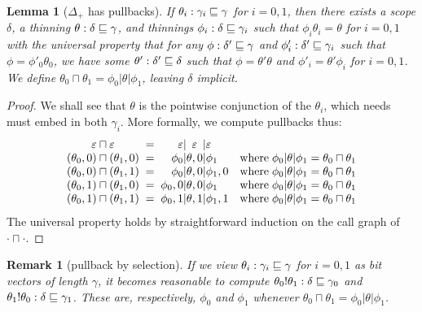 \documentclass{jfp1}
\newtheorem{lemma}[theorem]{Lemma}
\newtheorem{remark}[theorem]{Remark}
\newcommand{\emp}{\varepsilon}
\begin{document}
\newcommand{\pb}[2]{#1 \sqcap #2}
\newcommand{\cp}[2]{#1 \sqcup #2}
\begin{lemma}[$\Delta_+$ has pullbacks]
  If $\theta_i : \gamma_i\sqsubseteq\gamma$ for $i=0,1$, then there exists a
  scope $\delta$, a thinning $\theta : \delta\sqsubseteq\gamma$, and
  thinnings $\phi_i : \delta\sqsubseteq\gamma_i$ such that
  $\phi_i\theta_i = \theta$  for $i=0,1$ with the universal property that
  for any $\phi:\delta'\sqsubseteq\gamma$ and $\phi'_i : \delta'\sqsubseteq\gamma_i$ such that
  $\phi=\phi'_0\theta_0$, we have some $\theta' : \delta'\sqsubseteq\delta$
  such that
  $\phi=\theta'\theta$ and
  $\phi'_i = \theta'\phi_i$ for $i=0,1$. We define
  $\pb{\theta_0}{\theta_1} = \phi_0 | \theta | \phi_1$,
  leaving $\delta$ implicit.
\end{lemma}
\begin{proof}
  We shall see that $\theta$ is the pointwise conjunction of the $\theta_i$,
  which needs must embed in both $\gamma_i$. More formally, we compute pullbacks thus:
  \[\begin{array}{c@{\;\;=\;\;}r@{|}c@{|}ll}
    \pb{\emp}{\emp} & \emp&\emp&\emp & \\
    \pb{(\theta_0,0)}{(\theta_1,0)} & \phi_0&\theta,0&\phi_1
      & \mbox{where}\;\phi_0|\theta|\phi_1 = \pb{\theta_0}{\theta_1} \\                                     
    \pb{(\theta_0,0)}{(\theta_1,1)} & \phi_0&\theta,0&\phi_1,0
      & \mbox{where}\;\phi_0|\theta|\phi_1 = \pb{\theta_0}{\theta_1} \\
    \pb{(\theta_0,1)}{(\theta_1,0)} & \phi_0,0&\theta,0&\phi_1
      & \mbox{where}\;\phi_0|\theta|\phi_1 = \pb{\theta_0}{\theta_1} \\
    \pb{(\theta_0,1)}{(\theta_1,1)} & \phi_0,1&\theta,1&\phi_1,1
      & \mbox{where}\;\phi_0|\theta|\phi_1 = \pb{\theta_0}{\theta_1} \\
    \end{array}\]
  The universal property holds by straightforward induction on the call graph
  of $\pb\cdot\cdot$.
\end{proof}

\begin{remark}[pullback by selection]
  If we view $\theta_i : \gamma_i\sqsubseteq\gamma$ for $i=0,1$ as bit
  vectors of length $\gamma$, it
  becomes reasonable to compute $\theta_0!\theta_1 :
  \delta\sqsubseteq\gamma_0$
  and $\theta_1!\theta_0 : \delta\sqsubseteq\gamma_1$. These are,
  respectively, $\phi_0$ and $\phi_1$ whenever
  $\pb{\theta_0}{\theta_1} = \phi_0 | \theta | \phi_1$.
\end{remark}
\end{document}
